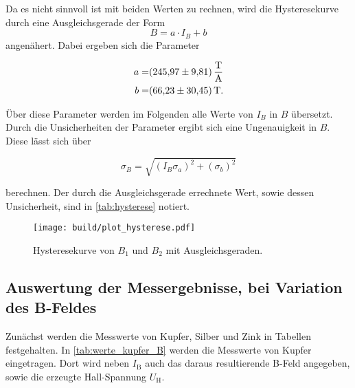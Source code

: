 Da es nicht sinnvoll ist mit beiden Werten zu rechnen, wird die Hysteresekurve durch eine Ausgleichsgerade der Form
\begin{equation}
    B = a \cdot I_B + b
    \label{eq:gerade}
\end{equation}
angenähert.
Dabei ergeben sich die Parameter

\begin{align*}
    a =& \SI{245.97+-9.81}{\tesla\per\ampere} \\
    b =& \SI{66.23+-30.45}{\tesla}.
\end{align*}

Über diese Parameter werden im Folgenden alle Werte von $I_B$ in $B$ übersetzt.
Durch die Unsicherheiten der Parameter ergibt sich eine Ungenauigkeit in $B$.
Diese lässt sich über

\begin{equation}
    \sigma _B = \sqrt{\left(I_B \sigma _a \right)^2 + \left(\sigma _b \right)^2}
    \label{eq:B_fehler}
\end{equation}

berechnen.
Der durch die Ausgleichsgerade errechnete Wert, sowie dessen Unsicherheit, sind in \autoref{tab:hysterese} notiert.

\begin{figure}
    \centering
    \texttt{[image: build/plot\_hysterese.pdf]}
    \caption{Hysteresekurve von $B_1$ und $B_2$ mit Ausgleichsgeraden.\cite{numpy}}
    \label{fig:hysterese_plot}
\end{figure}

\subsection{Auswertung der Messergebnisse, bei Variation des B-Feldes}
\label{ssec:mess}

Zunächst werden die Messwerte von Kupfer, Silber und Zink in Tabellen festgehalten.
In \autoref{tab:werte_kupfer_B} werden die Messwerte von Kupfer eingetragen.
Dort wird neben $I_\text{B}$ auch das daraus resultierende B-Feld angegeben, sowie die erzeugte Hall-Spannung $U_\text{H}$.

